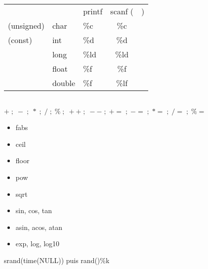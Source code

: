  \\
\begin{tabular}{lllcc}
 & & printf & scanf (&) \\
(unsigned) & char & \%c & \%c \\
(const) & int & \%d & \%d \\
 & long & \%ld & \%ld \\
 & float & \%f & \%f \\
 & double & \%f & \%lf \\
\end{tabular}

\par

 \\ $+ \; ; \; - \; ; \; * \; ; \; / \; ; \; \% \; ; \; ++ \; ; \; -- \; ; \; += \; ; \; -= \; ; \; *= \; ; \; /= \; ; \; \%=$

\par

\begin{itemize}
	\item fabs
	\item ceil
	\item floor
	\item pow
	\item sqrt
	\item sin, cos, tan
	\item asin, acos, atan
	\item exp, log, log10
\end{itemize}

 srand(time(NULL)) puis rand()\%k

